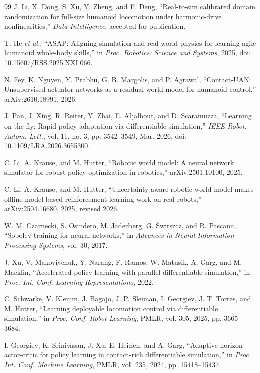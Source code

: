 \documentclass[letterpaper,10pt,conference]{ieeeconf}
\begin{document}
\begin{thebibliography}{99}
J. Li, X. Dong, S. Xu, Y. Zheng, and F. Deng, ``Real-to-sim calibrated domain randomization for full-size humanoid locomotion under harmonic-drive nonlinearities,'' \emph{Data Intelligence}, accepted for publication.

T. He \emph{et al.}, \textquotedblleft ASAP: Aligning simulation and real-world physics for learning agile humanoid whole-body skills,\textquotedblright{} in \emph{Proc. Robotics: Science and Systems}, 2025, doi: 10.15607/RSS.2025.XXI.066.

N. Fey, K. Nguyen, Y. Prabhu, G. B. Margolis, and P. Agrawal, ``Contact-UAN: Unsupervised actuator networks as a residual world model for humanoid control,'' arXiv:2610.18991, 2026.

J. Pan, J. Xing, R. Reiter, Y. Zhai, E. Aljalbout, and D. Scaramuzza, ``Learning on the fly: Rapid policy adaptation via differentiable simulation,'' \emph{IEEE Robot. Autom. Lett.}, vol. 11, no. 3, pp. 3542--3549, Mar. 2026, doi: 10.1109/LRA.2026.3655300.

C. Li, A. Krause, and M. Hutter, \textquotedblleft Robotic world model: A neural network simulator for robust policy optimization in robotics,\textquotedblright{} arXiv:2501.10100, 2025.

C. Li, A. Krause, and M. Hutter, \textquotedblleft Uncertainty-aware robotic world model makes offline model-based reinforcement learning work on real robots,\textquotedblright{} arXiv:2504.16680, 2025, revised 2026.

W. M. Czarnecki, S. Osindero, M. Jaderberg, G. \'Swirszcz, and R. Pascanu, \textquotedblleft Sobolev training for neural networks,\textquotedblright{} in \emph{Advances in Neural Information Processing Systems}, vol. 30, 2017.

J. Xu, V. Makoviychuk, Y. Narang, F. Ramos, W. Matusik, A. Garg, and M. Macklin, \textquotedblleft Accelerated policy learning with parallel differentiable simulation,\textquotedblright{} in \emph{Proc. Int. Conf. Learning Representations}, 2022.

C. Schwarke, V. Klemm, J. Bagajo, J. P. Sleiman, I. Georgiev, J. T. Torres, and M. Hutter, ``Learning deployable locomotion control via differentiable simulation,'' in \emph{Proc. Conf. Robot Learning}, PMLR, vol. 305, 2025, pp. 3665--3684.

I. Georgiev, K. Srinivasan, J. Xu, E. Heiden, and A. Garg, ``Adaptive horizon actor-critic for policy learning in contact-rich differentiable simulation,'' in \emph{Proc. Int. Conf. Machine Learning}, PMLR, vol. 235, 2024, pp. 15418--15437.


\end{thebibliography}
\end{document}
